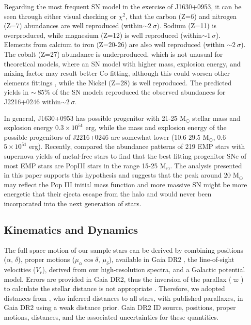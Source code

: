 Regarding the most frequent SN model in the exercise of J1630+0953, it can be
seen through either visual checking or $\chi^{2}$, that the carbon (Z=6) and
nitrogen (Z=7) abundances are well reproduced (within$\sim 2~\sigma$). Sodium
(Z=11) is overproduced, while magnesium (Z=12) is well reproduced (within$\sim
1~\sigma$). Elements from calcium to iron (Z=20-26) are also well reproduced
(within $\sim 2~\sigma$). The cobalt (Z=27) abundance is underproduced, which is
not unusual for theoretical models, where an SN model with higher mass,
explosion energy, and mixing factor may result better Co fitting, although this
could worsen other elements fittings \citep[see][and references
therein]{2014ApJ...785...98T}, while the Nickel (Z=28) is well reproduced. The
predicted yields in  $\sim~85 \%$ of the SN models reproduced the observed
abundances for J2216+0246  within$\sim 2~\sigma$. 

In general, J1630+0953 has possible progenitor with 21-25 M$_{\odot}$ stellar
mass and explosion energy $0.3 \times 10^{51}$ erg, while the mass and
explosion energy of the possible progenitors of J2216+0246 are somewhat lower
(10.6-29.5 M$_{\odot}$, $0.6$-$5 \times 10^{51}$ erg). Recently,
\citet{2018ApJ...857...46I} compared the abundance patterns of 219 EMP stars
with supernova yields of metal-free stars to find that the best fitting
progenitor SNe of most EMP stars are PopIII stars in the range 15-25
M$_{\odot}$. The analysis presented in this paper supports this
hypothesis and suggests that the peak around 20 M$_{\odot}$ may reflect the Pop
III initial mass function and more massive SN might be more energetic that their
ejecta escape from the halo and would never been incorporated into the next
generation of stars.

\subsection{Kinematics and Dynamics} \label{sec:kinematics}

The full space motion of our sample stars can be derived by combining positions
($\alpha$, $\delta$), proper motions ($\mu_{\alpha}\cos\delta$, $\mu_{\delta}$),
available in Gaia DR2 \citep{2018A&A...616A...1G}, the line-of-sight velocities
($V_r$), derived from our high-resolution spectra, and a Galactic potential model. Errors are provided in Gaia
DR2, thus the inversion of the parallax ($\varpi$) to calculate the stellar
distance is not appropriate \citep[see][for a recent
discussion]{2018A&A...616A...9L}.  Therefore, we adopted distances from
\citet[][]{2018AJ....156...58B}, who inferred distances to all stars, with
published parallaxes, in Gaia DR2 using a weak distance prior. Gaia DR2 ID
source, positions, proper motions, distances, and the associated uncertainties
for these quantities. 


